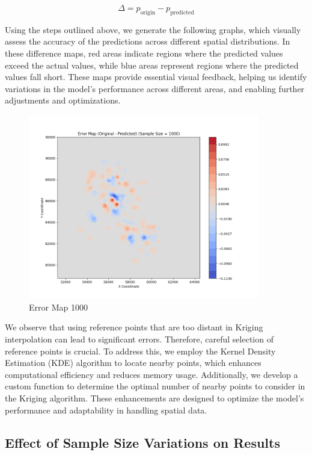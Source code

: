 \documentclass{swmcmthesis}
\begin{document}
\begin{equation}
\Delta = p_{\text{origin}} - p_{\text{predicted}}
\end{equation}

Using the steps outlined above, we generate the following graphs, which visually assess the accuracy of the predictions across different spatial distributions. In these difference maps, red areas indicate regions where the predicted values exceed the actual values, while blue areas represent regions where the predicted values fall short. These maps provide essential visual feedback, helping us identify variations in the model’s performance across different areas, and enabling further adjustments and optimizations.

\begin{figure}[h!t]
	\centering
	\includegraphics[width=0.9\textwidth]{Problem 1/Problem 1/Error_Map_Sample_Size_1000.png}
	\caption{Error Map 1000}
\end{figure}

We observe that using reference points that are too distant in Kriging interpolation can lead to significant errors. Therefore, careful selection of reference points is crucial. To address this, we employ the Kernel Density Estimation (KDE) algorithm to locate nearby points, which enhances computational efficiency and reduces memory usage. Additionally, we develop a custom function to determine the optimal number of nearby points to consider in the Kriging algorithm. These enhancements are designed to optimize the model's performance and adaptability in handling spatial data.

\subsection{Effect of Sample Size Variations on Results}
\end{document}
